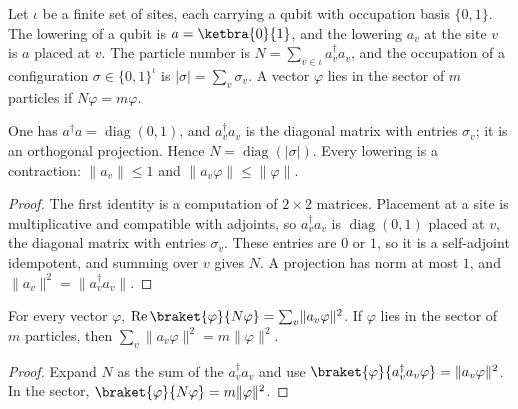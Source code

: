 \begin{definition}
    \label{def:hardcore_number}
    \leanok
    Let $\iota$ be a finite set of sites, each carrying a qubit with occupation basis
    $\{0,1\}$. The lowering of a qubit is $a=\ketbra{0}{1}$, and the lowering $a_v$ at
    the site $v$ is $a$ placed at $v$. The particle number is
    $N=\sum_{v\in\iota}a_v^\dagger a_v$, and the occupation of a configuration
    $\sigma\in\{0,1\}^\iota$ is $|\sigma|=\sum_v\sigma_v$. A vector $\varphi$ lies in the
    sector of $m$ particles if $N\varphi=m\varphi$.
\end{definition}

\begin{lemma}
    \label{lem:hardcore_number_diagonal}
    \leanok
    One has $a^\dagger a=\operatorname{diag}(0,1)$, and $a_v^\dagger a_v$ is the diagonal
    matrix with entries $\sigma_v$; it is an orthogonal projection. Hence
    $N=\operatorname{diag}(|\sigma|)$. Every lowering is a contraction:
    $\lVert a_v\rVert\le1$ and $\lVert a_v\varphi\rVert\le\lVert\varphi\rVert$.
\end{lemma}
\begin{proof}\leanok
    The first identity is a computation of $2\times2$ matrices. Placement at a site is
    multiplicative and compatible with adjoints, so $a_v^\dagger a_v$ is
    $\operatorname{diag}(0,1)$ placed at $v$, the diagonal matrix with entries
    $\sigma_v$. These entries are $0$ or $1$, so it is a self-adjoint idempotent, and
    summing over $v$ gives $N$. A projection has norm at most $1$, and
    $\lVert a_v\rVert^2=\lVert a_v^\dagger a_v\rVert$.
\end{proof}

\begin{lemma}
    \label{lem:hardcore_sector_identity}
    \leanok
    For every vector $\varphi$, $\operatorname{Re}\braket{\varphi}{N\varphi}
        =\sum_v\lVert a_v\varphi\rVert^2$. If $\varphi$ lies in the sector of $m$
    particles, then $\sum_v\lVert a_v\varphi\rVert^2=m\lVert\varphi\rVert^2$.
\end{lemma}
\begin{proof}\leanok
    Expand $N$ as the sum of the $a_v^\dagger a_v$ and use
    $\braket{\varphi}{a_v^\dagger a_v\varphi}=\lVert a_v\varphi\rVert^2$. In the sector,
    $\braket{\varphi}{N\varphi}=m\lVert\varphi\rVert^2$.
\end{proof}

